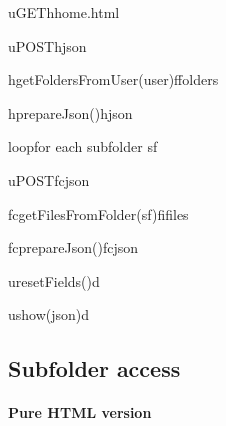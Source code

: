 \documentclass[a4paper, dvipsnames]{article}
\begin{document}
	\begin{center}
		\begin{sequencediagram}
			
			\begin{call}{u}{GET}{h}{home.html}
			\end{call}
			
			\begin{call}{u}{POST}{h}{json}
				\begin{call}{h}{getFoldersFromUser(user)}{f}{folders}
				\end{call}
				\begin{call}{h}{prepareJson()}{h}{json}
				\end{call}
			\end{call}
			
			\begin{sdblock}{loop}{for each subfolder sf}
				\begin{call}{u}{POST}{fc}{json}
					\begin{call}{fc}{getFilesFromFolder(sf)}{fi}{files}
					\end{call}
					\begin{call}{fc}{prepareJson()}{fc}{json}
					\end{call}
				\end{call}
			\end{sdblock}
			
			\begin{call}{u}{resetFields()}{d}{}
			\end{call}
			\begin{call}{u}{show(json)}{d}{}
			\end{call}
		\end{sequencediagram}
	\end{center}
	
	\pagebreak
	
	\subsection{Subfolder access}
	
	\paragraph{Pure HTML version}
	
\end{document}
